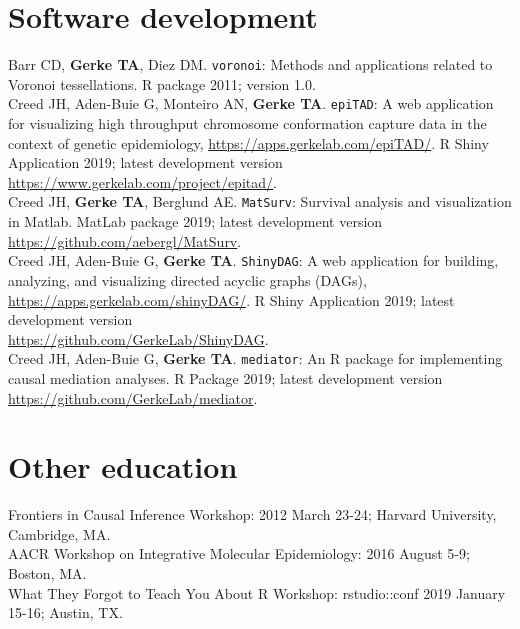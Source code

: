 \documentclass[11pt, a4paper]{article} %
\begin{document}
\section*{Software development}
Barr CD, {\bf Gerke TA}, Diez DM. \verb|voronoi|: Methods and applications related to Voronoi tessellations. R package 2011; version 1.0.\\

Creed JH, Aden-Buie G, Monteiro AN, {\bf Gerke TA}. \verb|epiTAD|: A web application for visualizing high throughput chromosome conformation capture data in the context of genetic epidemiology, \href{https://apps.gerkelab.com/epiTAD/}{https://apps.gerkelab.com/epiTAD/}. R Shiny Application 2019; latest development version \href{https://www.gerkelab.com/project/epitad/}{https://www.gerkelab.com/project/epitad/}.\\

Creed JH, {\bf Gerke TA}, Berglund AE. \verb|MatSurv|: Survival analysis and visualization in Matlab. MatLab package 2019; latest development version \href{https://github.com/aebergl/MatSurv}{https://github.com/aebergl/MatSurv}.\\

Creed JH, Aden-Buie G, {\bf Gerke TA}. \verb|ShinyDAG|: A web application for building, analyzing, and visualizing directed acyclic graphs (DAGs), \href{https://apps.gerkelab.com/shinyDAG/}{https://apps.gerkelab.com/shinyDAG/}. R Shiny Application 2019; latest development version \\\href{https://github.com/GerkeLab/ShinyDAG}{https://github.com/GerkeLab/ShinyDAG}.\\

Creed JH, Aden-Buie G, {\bf Gerke TA}. \verb|mediator|: An R package for implementing causal mediation analyses. R Package 2019; latest development version \\\href{https://github.com/GerkeLab/mediator}{https://github.com/GerkeLab/mediator}.

\section*{Other education}
Frontiers in Causal Inference Workshop: 2012 March 23-24; Harvard University, Cambridge, MA.\\

AACR Workshop on Integrative Molecular Epidemiology: 2016 August 5-9; Boston, MA.\\

What They Forgot to Teach You About R Workshop: rstudio::conf 2019 January 15-16; Austin, TX.
\end{document}
